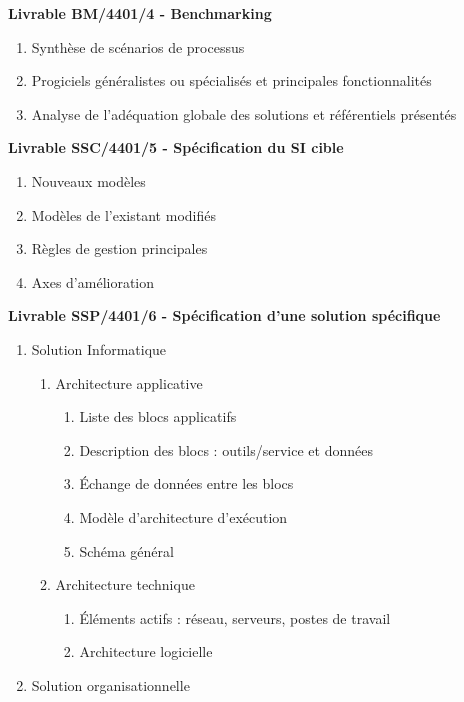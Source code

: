\bf{Livrable BM/4401/4 - Benchmarking} \\

\begin{enumerate}
    \item Synthèse de scénarios de processus
    \item Progiciels généralistes ou spécialisés et principales fonctionnalités
    \item Analyse de l'adéquation globale des solutions et référentiels présentés \\
\end{enumerate}

\bf{Livrable SSC/4401/5 - Spécification du SI cible} \\

\begin{enumerate}
    \item Nouveaux modèles
    \item Modèles de l'existant modifiés
    \item Règles de gestion principales
    \item Axes d'amélioration \\
\end{enumerate}

\bf{Livrable SSP/4401/6 - Spécification d’une solution spécifique} \\

\begin{enumerate}
    \item Solution Informatique
        \begin{enumerate}
            \item Architecture applicative
                \begin{enumerate}
                    \item Liste des blocs applicatifs
                    \item Description des blocs : outils/service et données
                    \item Échange de données entre les blocs
                    \item Modèle d’architecture d’exécution
                    \item Schéma général
                \end{enumerate}
            \item Architecture technique
                \begin{enumerate}
                    \item Éléments actifs : réseau, serveurs, postes de travail
                    \item Architecture logicielle
                \end{enumerate}
        \end{enumerate}
    \item Solution organisationnelle \\
\end{enumerate}

